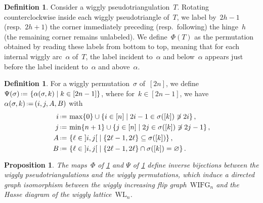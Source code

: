 \documentclass{amsart}
\newtheorem{proposition}[theorem]{Proposition}
\theoremstyle{definition}
\newtheorem{definition}[theorem]{Definition}
\newcommand{\set}[2]{\left\{ #1 \;\middle|\; #2 \right\}} %
\newcommand{\eqdef}{\mbox{\,\raisebox{0.2ex}{\scriptsize\ensuremath{\mathrm:}}\ensuremath{=}\,}} %
\newcommand{\wigglyIncreasingFlipGraph}{\mathrm{WIFG}} %
\newcommand{\wigglyLattice}{\mathrm{WL}} %
\begin{document}
\begin{definition}
\label{def:bijection1}
Consider a wiggly pseudotriangulation~$T$.
Rotating counterclockwise inside each wiggly pseudotriangle of~$T$, we label by~$2h-1$ (resp.~$2h+1$) the corner immediately preceding (resp.~following) the hinge~$h$ (the remaining corner remains unlabeled).
We define~$\Phi(T)$ as the permutation obtained by reading these labels from bottom to top, meaning that for each internal wiggly arc~$\alpha$ of~$T$, the label incident to~$\alpha$ and below~$\alpha$ appears just before the label incident to~$\alpha$ and above~$\alpha$.
\end{definition}

\begin{definition}
\label{def:bijection2}
For a wiggly permutation~$\sigma$ of~$[2n]$, we define~$\Psi(\sigma) \eqdef \set{\alpha(\sigma, k)}{k \in [2n-1]}$, where for~$k \in [2n-1]$, we have~$\alpha(\sigma, k) \eqdef ( i, j, A, B)$ with
\begin{align*}
i & \eqdef \max \{0\} \cup \set{i \in [n]}{2i-1 \in \sigma([k]) \not\ni 2i}, \\
j & \eqdef \min \{n+1\} \cup \set{j \in [n]}{2j \in \sigma([k]) \not\ni 2j-1}, \\
A & \eqdef \set{\ell \in {]i,j[}}{\{2\ell-1, 2\ell\} \subseteq \sigma([k])}, \\
B & \eqdef \set{\ell \in {]i,j[}}{\{2\ell-1, 2\ell\} \cap \sigma([k]) = \varnothing}.
\end{align*}
\end{definition}

\begin{proposition}
The maps~$\Phi$ of \cref{def:bijection1} and $\Psi$ of \cref{def:bijection2} define inverse bijections between the wiggly pseudotriangulations and the wiggly permutations, which induce a directed graph isomorphism between the wiggly increasing flip graph~$\wigglyIncreasingFlipGraph_n$ and the Hasse diagram of the wiggly lattice~$\wigglyLattice_n$.
\end{proposition}
\end{document}
